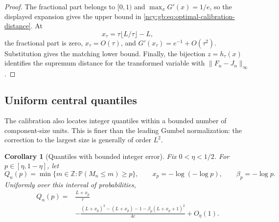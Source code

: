 \documentclass[11pt,letterpaper]{article}
\numberwithin{equation}{section}
\newtheorem{corollary}[theorem]{Corollary}
\theoremstyle{remark}\newtheorem{remark}[theorem]{Remark}
\theoremstyle{definition}\newtheorem{definition}[theorem]{Definition}\theoremstyle{plain}
\newcommand{\Pbb}{\mathbb P}
\newcommand{\Z}{\mathbb Z}
\begin{document}
\begin{proof}
The fractional part belongs to $[0,1)$ and
$\max_xG'(x)=1/e$, so the displayed expansion gives the upper bound
in \eqref{ncy:gb:eq:optimal-calibration-distance}.
At
\[
 x_\tau=\tau\lfloor L/\tau\rfloor-L,
\]
the fractional part is zero, $x_\tau=O(\tau)$, and
$G'(x_\tau)=e^{-1}+O(\tau^2)$.
Substitution gives the matching lower bound.
Finally, the bijection $z=h_\tau(x)$ identifies the supremum
distance for the transformed variable with $\|F_n-J_n\|_\infty$.
\end{proof}

\subsection{Uniform central quantiles}

The calibration also locates integer quantiles within a bounded number
of component-size units.  This is finer than the leading Gumbel
normalization: the correction to the largest size is generally of
order $L^2$.

\begin{corollary}[Quantiles with bounded integer error]
\label{ncy:gb:cor:central-quantiles}
Fix $0<\eta<1/2$.  For $p\in[\eta,1-\eta]$, let
\[
 Q_n(p)=\min\{m\in\Z:\Pbb(M_n\le m)\ge p\},\qquad
 x_p=-\log(-\log p),\qquad \beta_p=-\log p.
\]
Uniformly over this interval of probabilities,
\begin{equation}
\label{ncy:gb:eq:central-quantile-expansion}
 \begin{split}
 Q_n(p)={}&\frac{L+x_p}{\tau}\\
 &-\frac{(L+x_p)^2-(L+x_p)-1
              -\beta_p(L+x_p+1)^2}{4c}
   +O_\eta(1).
 \end{split}
\end{equation}
\end{corollary}
\end{document}
